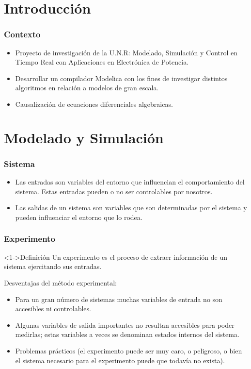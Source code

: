 \section{Introducción}

\begin{frame}
	\frametitle{Contexto}
    \begin{itemize}
        \item<1-> Proyecto de investigación de la U.N.R: Modelado, Simulación y Control en Tiempo Real con Aplicaciones en Electrónica de Potencia.
        \item<2-> Desarrollar un compilador Modelica con los fines de investigar distintos algoritmos en relación a modelos de gran escala.
        \item<3-> Causalización de ecuaciones diferenciales algebraicas.
    \end{itemize}
\end{frame}

\section{Modelado y Simulación}

\begin{frame}
	\frametitle{Sistema}
	\begin{itemize}
		\begin{block}<1->{Definición}
			Un sistema es un objeto o una colección de objetos cuyas propiedades queremos estudiar.
		\end{block}
	  	\item<2-> Las entradas son variables del entorno que influencian el comportamiento del sistema. Estas entradas pueden o no ser controlables por nosotros. 
		\item<3-> Las salidas de un sistema son variables que son determinadas por el sistema y pueden influenciar el entorno que lo rodea.
	\end{itemize}
\end{frame}

\begin{frame}
	\frametitle{Experimento}
	\begin{block}<1->{Definición}
		Un experimento es el proceso de extraer información de un sistema ejercitando sus entradas.
	\end{block}
	Desventajas del método experimental:
	\begin{itemize}
	  	\item<2-> Para un gran número de sistemas muchas variables de entrada no son accesibles ni controlables.
		\item<3-> Algunas variables de salida importantes no resultan accesibles para poder medirlas; estas variables a veces se denominan estados internos del sistema.
		\item<4-> Problemas prácticos (el experimento puede ser muy caro, o peligroso, o bien el sistema necesario para el experimento puede que todavía no exista).
	\end{itemize}
\end{frame}

